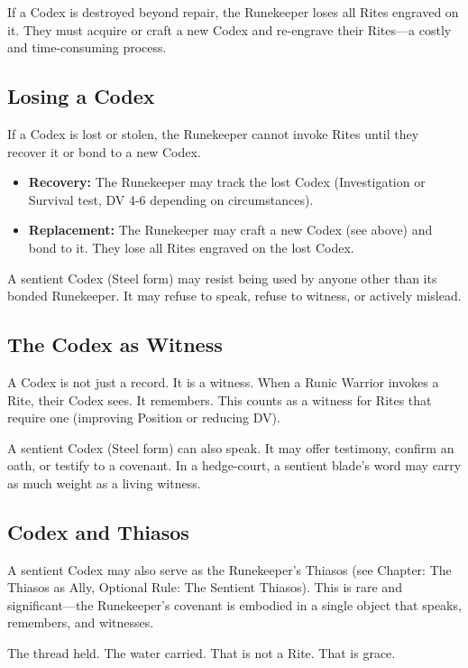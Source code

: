 If a Codex is destroyed beyond repair, the Runekeeper loses all Rites engraved on it. They must acquire or craft a new Codex and re-engrave their Rites—a costly and time-consuming process.

\subsection{Losing a Codex}

If a Codex is lost or stolen, the Runekeeper cannot invoke Rites until they recover it or bond to a new Codex.

\begin{itemize}
\item \textbf{Recovery:} The Runekeeper may track the lost Codex (Investigation or Survival test, DV 4-6 depending on circumstances).
\item \textbf{Replacement:} The Runekeeper may craft a new Codex (see above) and bond to it. They lose all Rites engraved on the lost Codex.
\end{itemize}

A sentient Codex (Steel form) may resist being used by anyone other than its bonded Runekeeper. It may refuse to speak, refuse to witness, or actively mislead.

\subsection{The Codex as Witness}

A Codex is not just a record. It is a witness. When a Runic Warrior invokes a Rite, their Codex sees. It remembers. This counts as a witness for Rites that require one (improving Position or reducing DV).

A sentient Codex (Steel form) can also speak. It may offer testimony, confirm an oath, or testify to a covenant. In a hedge-court, a sentient blade's word may carry as much weight as a living witness.

\subsection{Codex and Thiasos}

A sentient Codex may also serve as the Runekeeper's Thiasos (see Chapter: The Thiasos as Ally, Optional Rule: The Sentient Thiasos). This is rare and significant—the Runekeeper's covenant is embodied in a single object that speaks, remembers, and witnesses.

The thread held. The water carried. That is not a Rite. That is grace.
